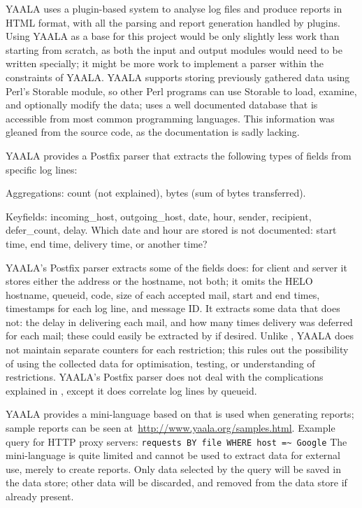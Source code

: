 YAALA uses a plugin-based system to analyse log files and produce reports
in HTML format, with all the parsing and report generation handled by
plugins.  Using YAALA as a base for this project would be only slightly
less work than starting from scratch, as both the input and output modules
would need to be written specially; it might be more work to implement a
parser within the constraints of YAALA\@.  YAALA supports storing
previously gathered data using Perl's Storable module, so other Perl
programs can use Storable to load, examine, and optionally modify the data;
\parsername{} uses a well documented database that is accessible from most
common programming languages.  This information was gleaned from the source
code, as the documentation is sadly lacking.

YAALA provides a Postfix parser that extracts the following types of fields
from specific log lines:

\begin{eqlist}

    \item [Aggregations:] count (not explained), bytes (sum of bytes
        transferred).

    \item [Keyfields:] incoming\_host, outgoing\_host, date, hour, sender,
        recipient, defer\_count, delay.  Which date and hour are stored is
        not documented: start time, end time, delivery time, or another
        time?

\end{eqlist}

\noindent{}YAALA's Postfix parser extracts some of the fields \parsername{}
does: for client and server it stores either the  address or
the hostname, not both; it omits the HELO hostname, queueid, 
code, size of each accepted mail, start and end times, timestamps for each
log line, and message ID\@.  It extracts some data that \parsername{} does
not: the delay in delivering each mail, and how many times delivery was
deferred for each mail; these could easily be extracted by \parsername{} if
desired.  Unlike \parsername{}, YAALA does not maintain separate counters
for each restriction; this rules out the possibility of using the collected
data for optimisation, testing, or understanding of restrictions.  YAALA's
Postfix parser does not deal with the complications explained in
, except it does correlate log lines by queueid.

YAALA provides a mini-language based on  that is used when
generating reports; sample reports can be seen
at~\url{http://www.yaala.org/samples.html}.  Example query for HTTP proxy
servers: \newline{} \tab{} \texttt{requests BY file WHERE host =\~{}
Google} \newline{} The mini-language is quite limited and cannot be used to
extract data for external use, merely to create reports.  Only data
selected by the query will be saved in the data store; other data will be
discarded, and removed from the data store if already present.

